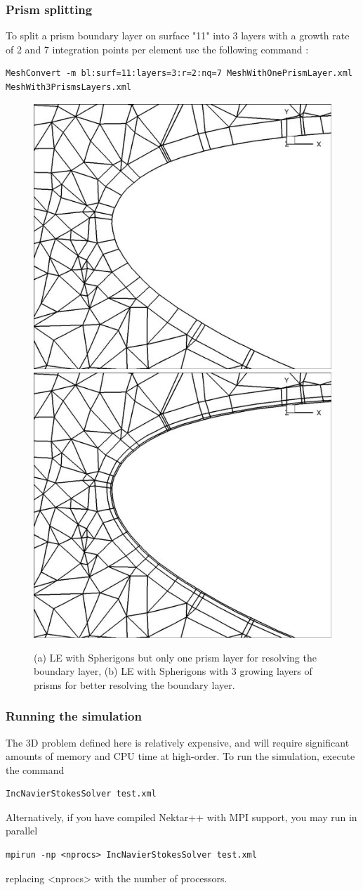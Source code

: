 \subsubsection{Prism splitting}
To split a prism boundary layer on surface "11" into 3 layers with a growth rate of 2 and 7 integration points per element use the following command :
\begin{lstlisting}[style=BashInputStyle]
MeshConvert -m bl:surf=11:layers=3:r=2:nq=7 MeshWithOnePrismLayer.xml
MeshWith3PrismsLayers.xml
\end{lstlisting}
\begin{figure}[!htbp]
\begin{center}
\includegraphics[width = 0.47 \textwidth]{Figures/SphnoBL.jpg}
\includegraphics[width = 0.47 \textwidth]{Figures/SphBL.jpg}
\caption{(a) LE with Spherigons but only one prism layer for resolving the boundary layer, (b)  LE with Spherigons with 3 growing layers of prisms for better resolving the boundary layer.}
\label{fig:}
\end{center}
\end{figure}

\subsubsection{Running the simulation}
The 3D problem defined here is relatively expensive, and will require significant amounts of memory and CPU time at high-order. To run the simulation, execute the command
\begin{lstlisting}[style=BashInputStyle]
IncNavierStokesSolver test.xml
\end{lstlisting}
Alternatively, if you have compiled Nektar++ with MPI support, you may run in parallel
\begin{lstlisting}[style=BashInputStyle]
mpirun -np <nprocs> IncNavierStokesSolver test.xml
\end{lstlisting}
replacing <nprocs> with the number of processors.

